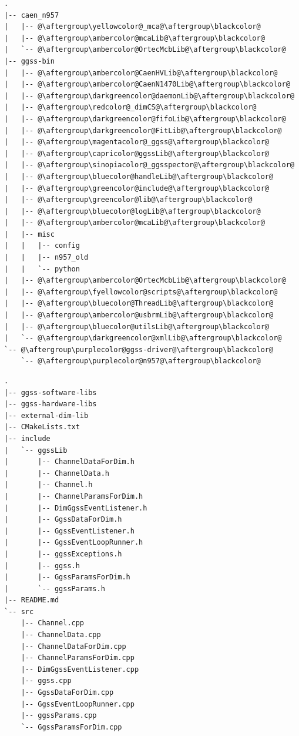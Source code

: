\newpage

\begin{lstlisting}[language=Cmd, caption={Pierwotna struktura katalogów}, label={lst:oldStructure},escapechar=@]
.
|-- caen_n957
|   |-- @\aftergroup\yellowcolor@_mca@\aftergroup\blackcolor@
|   |-- @\aftergroup\ambercolor@mcaLib@\aftergroup\blackcolor@
|   `-- @\aftergroup\ambercolor@OrtecMcbLib@\aftergroup\blackcolor@
|-- ggss-bin
|   |-- @\aftergroup\ambercolor@CaenHVLib@\aftergroup\blackcolor@
|   |-- @\aftergroup\ambercolor@CaenN1470Lib@\aftergroup\blackcolor@
|   |-- @\aftergroup\darkgreencolor@daemonLib@\aftergroup\blackcolor@
|   |-- @\aftergroup\redcolor@_dimCS@\aftergroup\blackcolor@
|   |-- @\aftergroup\darkgreencolor@fifoLib@\aftergroup\blackcolor@
|   |-- @\aftergroup\darkgreencolor@FitLib@\aftergroup\blackcolor@
|   |-- @\aftergroup\magentacolor@_ggss@\aftergroup\blackcolor@
|   |-- @\aftergroup\capricolor@ggssLib@\aftergroup\blackcolor@
|   |-- @\aftergroup\sinopiacolor@_ggsspector@\aftergroup\blackcolor@
|   |-- @\aftergroup\bluecolor@handleLib@\aftergroup\blackcolor@
|   |-- @\aftergroup\greencolor@include@\aftergroup\blackcolor@
|   |-- @\aftergroup\greencolor@lib@\aftergroup\blackcolor@
|   |-- @\aftergroup\bluecolor@logLib@\aftergroup\blackcolor@
|   |-- @\aftergroup\ambercolor@mcaLib@\aftergroup\blackcolor@
|   |-- misc
|   |   |-- config
|   |   |-- n957_old
|   |   `-- python
|   |-- @\aftergroup\ambercolor@OrtecMcbLib@\aftergroup\blackcolor@
|   |-- @\aftergroup\fyellowcolor@scripts@\aftergroup\blackcolor@
|   |-- @\aftergroup\bluecolor@ThreadLib@\aftergroup\blackcolor@
|   |-- @\aftergroup\ambercolor@usbrmLib@\aftergroup\blackcolor@
|   |-- @\aftergroup\bluecolor@utilsLib@\aftergroup\blackcolor@
|   `-- @\aftergroup\darkgreencolor@xmlLib@\aftergroup\blackcolor@
`-- @\aftergroup\purplecolor@ggss-driver@\aftergroup\blackcolor@
    `-- @\aftergroup\purplecolor@n957@\aftergroup\blackcolor@
\end{lstlisting}


\onecolumn

\newpage

\twocolumn

\begin{lstlisting}[caption={Nowa struktura biblioteki \textbf{ggss-lib}}, label={lst:newLibStructure}]
.
|-- ggss-software-libs
|-- ggss-hardware-libs
|-- external-dim-lib
|-- CMakeLists.txt
|-- include
|   `-- ggssLib
|       |-- ChannelDataForDim.h
|       |-- ChannelData.h
|       |-- Channel.h
|       |-- ChannelParamsForDim.h
|       |-- DimGgssEventListener.h
|       |-- GgssDataForDim.h
|       |-- GgssEventListener.h
|       |-- GgssEventLoopRunner.h
|       |-- ggssExceptions.h
|       |-- ggss.h
|       |-- GgssParamsForDim.h
|       `-- ggssParams.h
|-- README.md
`-- src
    |-- Channel.cpp
    |-- ChannelData.cpp
    |-- ChannelDataForDim.cpp
    |-- ChannelParamsForDim.cpp
    |-- DimGgssEventListener.cpp
    |-- ggss.cpp
    |-- GgssDataForDim.cpp
    |-- GgssEventLoopRunner.cpp
    |-- ggssParams.cpp
    `-- GgssParamsForDim.cpp

\end{lstlisting}

